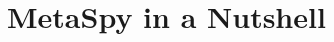 \documentclass[runningheads]{llncs}
\newcommand{\project}{{\sc MetaSpy}\xspace}
\newcommand{\ab}[1]{\nb{Alexandre}{blue}{#1}}
\newcommand{\lr}[1]{\nb{Lukas}{orange}{#1}}
\newcommand{\jr}[1]{\nb{Jorge}{cyan}{#1}}
\newcommand{\seclabel}[1]{\label{sec:#1}}
\begin{document}

\section{\project in a Nutshell}\seclabel{profiler}

% 
% 
% 
% 
% 
% 
% 
% 
% 
\end{document}

